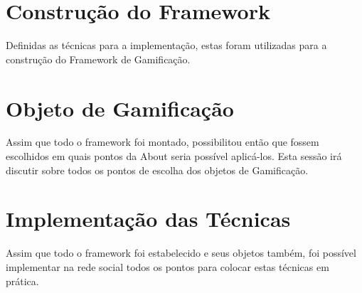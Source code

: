 \section{Construção do Framework}
\label{sec:gamifição}
Definidas as técnicas para a implementação, estas foram utilizadas para a construção do Framework
de Gamificação.

\section{Objeto de Gamificação}
\label{sec:gamifição}
Assim que todo o framework foi montado, possibilitou então que fossem escolhidos em quais
pontos da About seria possível aplicá-los. Esta sessão irá discutir sobre todos os pontos de escolha
dos objetos de Gamificação.

\section{Implementação das Técnicas}
\label{sec:gamifição}
Assim que todo o framework foi estabelecido e seus objetos também, foi possível implementar
na rede social todos os pontos para colocar estas técnicas em prática.

